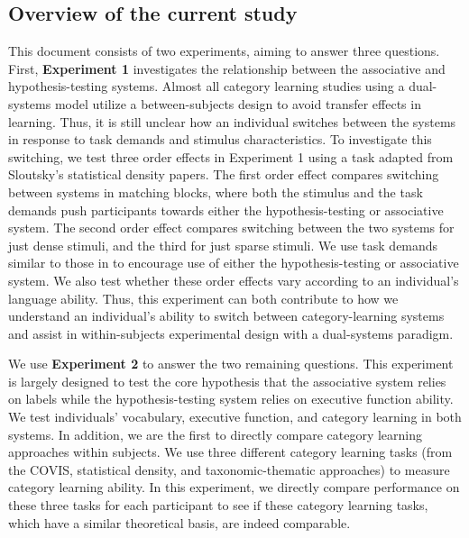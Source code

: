 \documentclass[../dissertation.tex]{subfiles}
\begin{document}
\subsection{Overview of the current study}
	This document consists of two experiments, aiming to answer three questions. First, \textbf{Experiment 1} investigates the relationship between the associative and hypothesis-testing systems. Almost all category learning studies using a dual-systems model utilize a between-subjects design to avoid transfer effects in learning. Thus, it is still unclear how an individual switches between the systems in response to task demands and stimulus characteristics. To investigate this switching, we test three order effects in Experiment 1 using a task adapted from Sloutsky's statistical density papers. The first order effect compares switching between systems in matching blocks, where both the stimulus and the task demands push participants towards either the hypothesis-testing or associative system. The second order effect compares switching between the two systems for just dense stimuli, and the third for just sparse stimuli. We use task demands similar to those in \citet{Kloos2008} to encourage use of either the hypothesis-testing or associative system. We also test whether these order effects vary according to an individual's language ability. Thus, this experiment can both contribute to how we understand an individual's ability to switch between category-learning systems and assist in within-subjects experimental design with a dual-systems paradigm. \par
	We use \textbf{Experiment 2} to answer the two remaining questions. This experiment is largely designed to test the core hypothesis that the associative system relies on labels while the hypothesis-testing system relies on executive function ability. We test individuals' vocabulary, executive function, and category learning in both systems. In addition, we are the first to directly compare category learning approaches within subjects. We use three different category learning tasks (from the COVIS, statistical density, and taxonomic-thematic approaches) to measure category learning ability. In this experiment, we directly compare performance on these three tasks for each participant to see if these category learning tasks, which have a similar theoretical basis, are indeed comparable.
\end{document}
